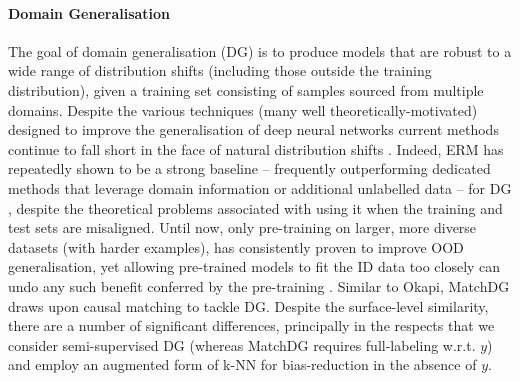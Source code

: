 \paragraph{Domain Generalisation} 
The goal of domain generalisation (DG) is to produce models that are robust to a wide range of
distribution shifts (including those outside the training distribution), given a training set
consisting of samples sourced from multiple domains.
%
Despite the various techniques (many well theoretically-motivated) designed to improve the
generalisation of deep neural networks current methods continue to fall short in the face of
natural distribution shifts \citep{gulrajani2020search, koh2021wilds}.
%
Indeed, ERM has repeatedly shown to be a strong baseline -- frequently outperforming dedicated
methods that leverage domain information or additional unlabelled data -- for DG
\citep{gulrajani2020search, SagWeiLeeGaoetal22}, despite the theoretical problems associated with
using it when the training and test sets are misaligned.
%
Until now, only pre-training on larger, more diverse datasets (with harder examples), has
consistently proven to improve OOD generalisation, yet allowing pre-trained models to fit the ID
data too closely can undo any such benefit conferred by the pre-training
\citep{andreassen2021evolution, kim2022broad, taori2020measuring, wiles2022a}.
%
%
Similar to Okapi, MatchDG \citep{mahajan2021domain} draws upon causal matching to tackle DG.
Despite the surface-level similarity, there are a number of significant differences, principally in the
respects that we consider semi-supervised DG (whereas MatchDG requires full-labeling w.r.t.
$y$) and employ an augmented form of k-NN for bias-reduction in the absence of $y$.

